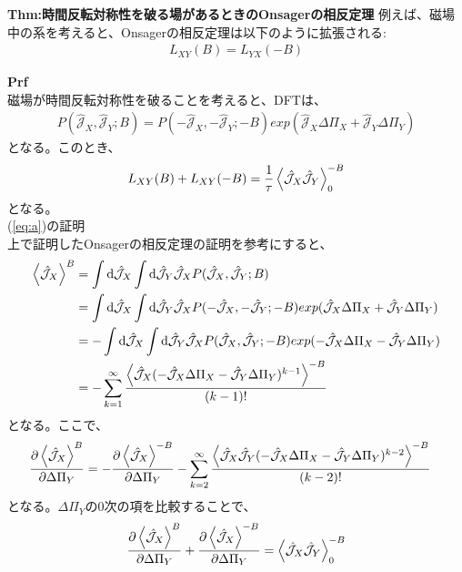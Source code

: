 \documentclass[a4paper,11pt]{jsarticle}
\begin{document}
\begin{itembox}[l]{\textbf{Thm:時間反転対称性を破る場があるときのOnsagerの相反定理}}
    例えば、磁場中の系を考えると、Onsagerの相反定理は以下のように拡張される:
    \begin{align}
        L_{XY} (B) = L_{YX} (-B)
    \end{align}
\end{itembox}
\textbf{Prf}\\
磁場が時間反転対称性を破ることを考えると、DFTは、
\begin{align}
    P(\hat{\mathcal{J}}_X, \hat{\mathcal{J}}_Y;B) = P(-\hat{\mathcal{J}}_X, -\hat{\mathcal{J}}_Y;-B)exp(\hat{\mathcal{J}}_X \Delta \Pi_X + \hat{\mathcal{J}}_Y \Delta \Pi_Y)
\end{align}
となる。このとき、
\begin{align}
    \label{eq:a}
    L_{XY} (B) + L_{XY} (-B) = \frac{1}{\tau} \ev{\hat{\mathcal{J}}_X \hat{\mathcal{J}}_Y}_0^{-B}
\end{align}
となる。\\
(\ref{eq:a})の証明\\
上で証明したOnsagerの相反定理の証明を参考にすると、
\begin{align}
    \ev{\hat{\mathcal{J}}_X} ^B &= \int \dd \hat{\mathcal{J}}_X \int \dd \hat{\mathcal{J}}_Y \hat{\mathcal{J}}_X P(\hat{\mathcal{J}}_X, \hat{\mathcal{J}}_Y;B)\\
    &= \int \dd \hat{\mathcal{J}}_X \int \dd \hat{\mathcal{J}}_Y \hat{\mathcal{J}}_X P(-\hat{\mathcal{J}}_X, -\hat{\mathcal{J}}_Y;-B)exp(\hat{\mathcal{J}}_X \Delta \Pi_X + \hat{\mathcal{J}}_Y \Delta \Pi_Y)\\
    &= -\int \dd \hat{\mathcal{J}}_X \int \dd \hat{\mathcal{J}}_Y \hat{\mathcal{J}}_X P(\hat{\mathcal{J}}_X, \hat{\mathcal{J}}_Y;-B)exp(-\hat{\mathcal{J}}_X \Delta \Pi_X - \hat{\mathcal{J}}_Y \Delta \Pi_Y)\\
    &= -\sum_{k=1}^{\infty} \frac{\ev{\hat{\mathcal{J}}_X(-\hat{\mathcal{J}}_X\Delta \Pi_X-\hat{\mathcal{J}}_Y\Delta \Pi_Y)^{k-1}}^{-B}}{(k-1)!}
\end{align}
となる。ここで、
\begin{align}
    \pdv{\ev{\hat{\mathcal{J}}_X}^B}{\Delta \Pi_Y} &= -\pdv{\ev{\hat{\mathcal{J}}_X}^{-B}}{\Delta \Pi_Y} - \sum_{k=2}^{\infty} \frac{\ev{\hat{\mathcal{J}}_X\hat{\mathcal{J}}_Y(-\hat{\mathcal{J}}_X\Delta \Pi_X-\hat{\mathcal{J}}_Y\Delta \Pi_Y)^{k-2}}^{-B}}{(k-2)!}
\end{align}
となる。$\Delta \Pi_Y$の0次の項を比較することで、
\begin{align}
    \pdv{\ev{\hat{\mathcal{J}}_X}^B}{\Delta \Pi_Y} + \pdv{\ev{\hat{\mathcal{J}}_X}^{-B}}{\Delta \Pi_Y} = \ev{\hat{\mathcal{J}}_X \hat{\mathcal{J}}_Y}_0^{-B}
\end{align}
\end{document}
